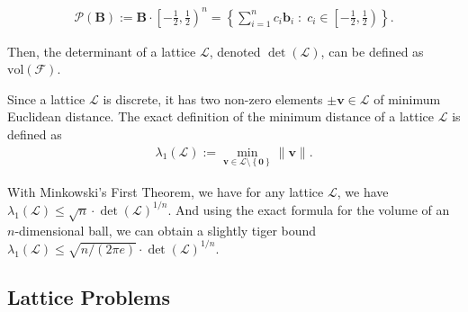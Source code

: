 \begin{align}
	\mathcal{P}(\mathbf{B}) := \mathbf{B} \cdot \left[ -\frac{1}{2}, \frac{1}{2} \right)^{n} = \left\lbrace \sum_{i=1}^{n} c_{i}\mathbf{b}_{i} \;:\; c_{i} \in \left[ -\frac{1}{2}, \frac{1}{2} \right) \right\rbrace.
\end{align}
\par Then, the determinant of a lattice $\mathcal{L}$, denoted $\det(\mathcal{L})$, can be defined as $\mathrm{vol}(\mathcal{F})$.
\par Since a lattice $\mathcal{L}$ is discrete, it has two non-zero elements $\pm \mathbf{v} \in \mathcal{L}$ of minimum Euclidean distance. The exact definition of the minimum distance of a lattice $\mathcal{L}$ is defined as
\begin{align}
\lambda_{1}(\mathcal{L}) := \min_{\mathbf{v}\in\mathcal{L}\setminus\left\lbrace\mathbf{0}\right\rbrace} \|\mathbf{v}\|.
\end{align}
\par With Minkowski's First Theorem, we have for any lattice $\mathcal{L}$, we have $\lambda_{1}(\mathcal{L}) \leq \sqrt{n}\cdot\det(\mathcal{L})^{1/n}$. And using the exact formula for the volume of an $n$-dimensional ball, we can obtain a slightly tiger bound $\lambda_{1}(\mathcal{L}) \leq \sqrt{n/(2\pi e)}\cdot\det(\mathcal{L})^{1/n}$.


\subsection{Lattice Problems}
